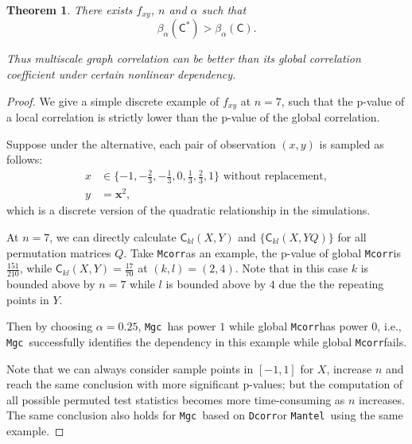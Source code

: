 \documentclass[11pt]{article}
\providecommand{\sct}[1]{{\sc \texttt{#1}}}
\providecommand{\mb}[1]{\boldsymbol{#1}}
\newcommand{\G}{\mathsf{C}}
\newcommand{\Mgc}{\sct{Mgc}}
\newcommand{\Dcorr}{\sct{Dcorr}}
\newcommand{\Mcorr}{\sct{Mcorr}}
\newcommand{\Mantel}{\sct{Mantel}}
\newtheorem{appThm}{Theorem}
\begin{document}
\begin{appThm}
There exists $f_{xy}$, $n$ and $\alpha$ such that 
\begin{equation}
\beta_{\alpha}(\G^{*}) > \beta_{\alpha}(\G).
\end{equation}

Thus multiscale graph correlation can be better than its global correlation coefficient under certain nonlinear dependency.
\end{appThm}
\begin{proof}
We give a simple discrete example of $f_{xy}$ at $n=7$, such that the p-value of a local correlation is strictly lower than the p-value of the global correlation. %

Suppose under the alternative, each pair of observation $(x,y)$ is sampled as follows:
\begin{align*} 
x &\in \{-1,-\frac{2}{3},-\frac{1}{3},0,\frac{1}{3},\frac{2}{3},1\} \mbox{ without replacement}, \\
y &= \mb{x}^2,
\end{align*}
which is a discrete version of the quadratic relationship in the simulations.

At $n=7$, we can directly calculate $\G_{kl}(X, Y)$ and $\{\G_{kl}(X, YQ)\}$ for all permutation matrices $Q$. Take \Mcorr as an example, the p-value of global \Mcorr is $\frac{151}{210}$, while $\G_{kl}(X, Y)=\frac{17}{70}$ at $(k,l)=(2,4)$. Note that in this case $k$ is bounded above by $n=7$ while $l$ is bounded above by $4$ due the the repeating points in $Y$. 

Then by choosing $\alpha=0.25$, \Mgc~has power $1$ while global \Mcorr has power $0$, i.e., \Mgc~successfully identifies the dependency in this example while global \Mcorr fails. 

Note that we can always consider sample points in $[-1,1]$ for $X$, increase $n$ and reach the same conclusion with more significant p-values; but the computation of all possible permuted test statistics becomes more time-consuming as $n$ increases. The same conclusion also holds for \Mgc~based on \Dcorr or \Mantel~using the same example.
\end{proof}



\end{document}
